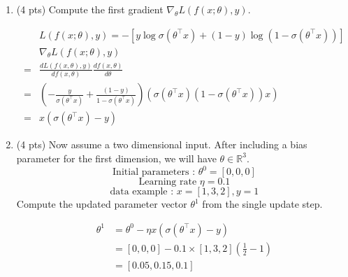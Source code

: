 \documentclass[a4paper]{article}
\theoremstyle{definition}
\newenvironment{soln}{
    \leavevmode\color{blue}\ignorespaces
}{}
\begin{document}
\begin{enumerate}
\begin{enumerate}
	\item (4 pts) Compute the first gradient $\nabla_{\theta} L(f(x;\theta), y)$.
	
\begin{soln}
$$
\begin{aligned}
&L(f(x;\theta), y) = -[y \log  \sigma(\theta^\top x) + (1-y)\log(1-\sigma(\theta^\top x))]\\
&\nabla_{\theta}L(f(x;\theta), y)\\
=&\frac{dL(f(x,\theta),y)}{df(x,\theta)}\frac{df(x,\theta)}{d\theta}\\
=&\left(-\frac{y}{\sigma(\theta^\top x)}+\frac{(1-y)}{1-\sigma(\theta^\top x)}\right)\left(\sigma(\theta^\top x)(1-\sigma(\theta^\top x))x\right)\\
=&x(\sigma(\theta^\top x)-y)
\end{aligned}
$$
\end{soln}
	
	\item (4 pts)
 Now assume a two dimensional input. After including a bias parameter for the first dimension, we will have $\theta\in\mathbb{R}^3$.
$$ \text{Initial parameters : }  \theta^{0}=[0, 0, 0]$$
$$ \text{Learning rate }\eta=0.1$$
$$ \text{data example : } x=[1, 3, 2], y=1$$
Compute the updated parameter vector $\theta^{1}$ from the single update step.
	
	\begin{soln} $$
\begin{aligned}
 \theta^1 &= \theta^0-\eta x(\sigma(\theta^\top x)-y)\\
&=[0,0,0]-0.1\times [1,3,2] (\frac{1}{2}-1)\\
&=[0.05, 0.15, 0.1]
 \end{aligned}
 $$\end{soln}
\end{enumerate}
\end{enumerate}
\end{document}
